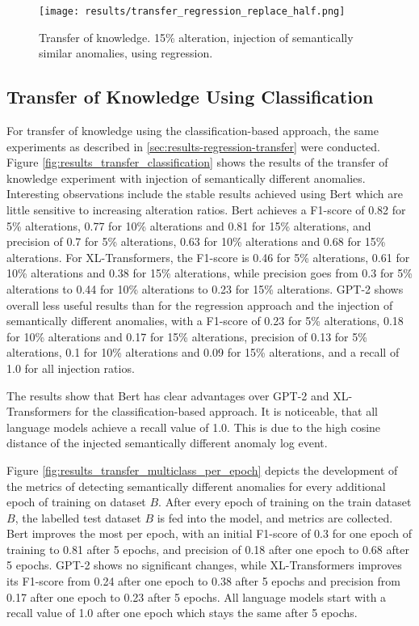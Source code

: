 \begin{figure}[H]
  \centering
  \captionsetup{justification=centering}
  \texttt{[image: results/transfer\_regression\_replace\_half.png]}\\
  \caption{Transfer of knowledge. 15\% alteration, injection of semantically similar anomalies, using regression.}
  \label{fig:replace_words_regression_transfer}
\end{figure}

\subsection{Transfer of Knowledge Using Classification \label{sec:results-classification-transfer}}

For transfer of knowledge using the classification-based approach, the same experiments as described in \ref{sec:results-regression-transfer} were conducted. Figure \ref{fig:results_transfer_classification} shows the results of the transfer of knowledge experiment with injection of semantically different anomalies. Interesting observations include the stable results achieved using Bert which are little sensitive to increasing alteration ratios. Bert achieves a F1-score of 0.82 for 5\% alterations, 0.77 for 10\% alterations and 0.81 for 15\% alterations, and precision of 0.7 for 5\% alterations, 0.63 for 10\% alterations and 0.68 for 15\% alterations. For XL-Transformers, the F1-score is 0.46 for 5\% alterations, 0.61 for 10\% alterations and 0.38 for 15\% alterations, while precision goes from 0.3 for 5\% alterations to 0.44 for 10\% alterations to 0.23 for 15\% alterations. GPT-2 shows overall less useful results than for the regression approach and the injection of semantically different anomalies, with a F1-score of 0.23 for 5\% alterations, 0.18 for 10\% alterations and 0.17 for 15\% alterations, precision of 0.13 for 5\% alterations, 0.1 for 10\% alterations and 0.09 for 15\% alterations, and a recall of 1.0 for all injection ratios.

The results show that Bert has clear advantages over GPT-2 and XL-Transformers for the classification-based approach. It is noticeable, that all language models achieve a recall value of 1.0. This is due to the high cosine distance of the injected semantically different anomaly log event.

Figure \ref{fig:results_transfer_multiclass_per_epoch} depicts the development of the metrics of detecting semantically different anomalies for every additional epoch of training on dataset $B$. After every epoch of training on the train dataset $B$, the labelled test dataset $B$ is fed into the model, and metrics are collected. Bert improves the most per epoch, with an initial F1-score of  0.3 for one epoch of training to 0.81 after 5 epochs, and precision of 0.18 after one epoch to 0.68 after 5 epochs. GPT-2 shows no significant changes, while XL-Transformers improves its F1-score from 0.24 after one epoch to 0.38 after 5 epochs and precision from 0.17 after one epoch to 0.23 after 5 epochs. All language models start with a recall value of 1.0 after one epoch which stays the same after 5 epochs.

